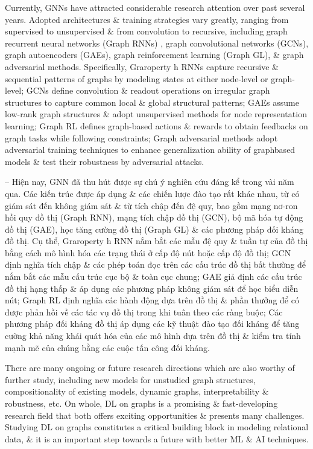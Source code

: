\documentclass{article}
\begin{document}
\begin{itemize}
\begin{itemize}
\begin{enumerate}
        \end{enumerate}
        Currently, GNNs have attracted considerable research attention over past several years. Adopted architectures \& training strategies vary greatly, ranging from supervised to unsupervised \& from convolution to recursive, including graph recurrent neural networks (Graph RNNs) , graph convolutional networks (GCNs), graph autoencoders (GAEs), graph reinforcement learning (Graph GL), \& graph adversarial methods. Specifically, Graroperty h RNNs capture recursive \& sequential patterns of graphs by modeling states at either node-level or graph-level; GCNs define convolution \& readout operations on irregular graph structures to capture common local \& global structural patterns; GAEs assume low-rank graph structures \& adopt unsupervised methods for node representation learning; Graph RL defines graph-based actions \& rewards to obtain feedbacks on graph tasks while following constraints; Graph adversarial methods adopt adversarial training techniques to enhance generalization ability of graphbased models \& test their robustness by adversarial attacks.

        -- Hiện nay, GNN đã thu hút được sự chú ý nghiên cứu đáng kể trong vài năm qua. Các kiến trúc được áp dụng \& các chiến lược đào tạo rất khác nhau, từ có giám sát đến không giám sát \& từ tích chập đến đệ quy, bao gồm mạng nơ-ron hồi quy đồ thị (Graph RNN), mạng tích chập đồ thị (GCN), bộ mã hóa tự động đồ thị (GAE), học tăng cường đồ thị (Graph GL) \& các phương pháp đối kháng đồ thị. Cụ thể, Graroperty h RNN nắm bắt các mẫu đệ quy \& tuần tự của đồ thị bằng cách mô hình hóa các trạng thái ở cấp độ nút hoặc cấp độ đồ thị; GCN định nghĩa tích chập \& các phép toán đọc trên các cấu trúc đồ thị bất thường để nắm bắt các mẫu cấu trúc cục bộ \& toàn cục chung; GAE giả định các cấu trúc đồ thị hạng thấp \& áp dụng các phương pháp không giám sát để học biểu diễn nút; Graph RL định nghĩa các hành động dựa trên đồ thị \& phần thưởng để có được phản hồi về các tác vụ đồ thị trong khi tuân theo các ràng buộc; Các phương pháp đối kháng đồ thị áp dụng các kỹ thuật đào tạo đối kháng để tăng cường khả năng khái quát hóa của các mô hình dựa trên đồ thị \& kiểm tra tính mạnh mẽ của chúng bằng các cuộc tấn công đối kháng.

        There are many ongoing or future research directions which are also worthy of further study, including new models for unstudied graph structures, compositionality of existing models, dynamic graphs, interpretability \& robustness, etc. On whole, DL on graphs is a promising \& fast-developing research field that both offers exciting opportunities \& presents many challenges. Studying DL on graphs constitutes a critical building block in modeling relational data, \& it is an important step towards a future with better ML \& AI techniques.


\end{itemize}
\end{itemize}
\end{document}
